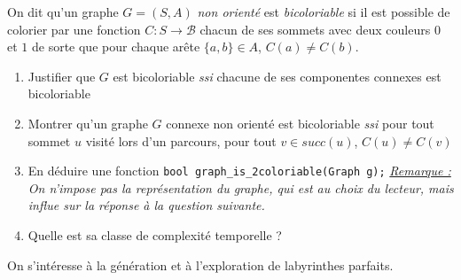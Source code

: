 \documentclass[../../../main.tex]{subfiles}
\begin{document}
 On dit qu'un graphe $G = (S, A)$ \textit{non orienté} est \textit{bicoloriable} si il est possible de colorier par une fonction $C:S\rightarrow \mathcal{B}$ chacun de ses sommets avec deux couleurs $0$ et $1$ de sorte que pour chaque arête $\{a, b\}\in A$, $C(a)\neq C(b)$.
\begin{enumerate}
	\item Justifier que $G$ est bicoloriable \textit{ssi} chacune de ses componentes connexes est bicoloriable
	\item Montrer qu'un graphe $G$ connexe non orienté est bicoloriable \textit{ssi} pour tout sommet $u$ visité lors d'un parcours, pour tout $v\in succ(u)$, $C(u)\neq C(v)$ 
	\item En déduire une fonction \texttt{bool graph_is_2coloriable(Graph g);} \newline
	\textit{\underline{Remarque :} On n'impose pas la représentation du graphe, qui est au choix du lecteur, mais influe sur la réponse à la question suivante.}
	\item Quelle est sa classe de complexité temporelle ?
\end{enumerate}


 On s'intéresse à la génération et à l'exploration de labyrinthes parfaits.
\end{document}
